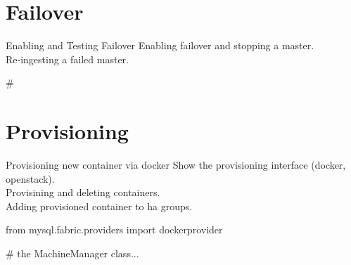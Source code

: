 \documentclass{beamer}[10]
\begin{document}

\section{Failover}
\begin{pyframe}{Enabling and Testing Failover}
Enabling failover and stopping a master. \\

Re-ingesting a failed master. \\

\begin{bashcode}
#
\end{bashcode}
\end{pyframe}


\section{Provisioning}
\begin{pyframe}{Provisioning new container via docker}
Show the provisioning interface (docker, openstack). \\

Provisining and deleting containers. \\

Adding provisioned container to ha groups. \\

\begin{pycode}
from mysql.fabric.providers import dockerprovider

# the MachineManager class...

\end{pycode}
\end{pyframe}
\end{document}
